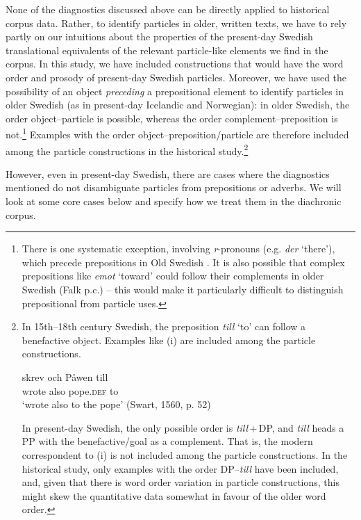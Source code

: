 \documentclass[output=paper]{langscibook}
\begin{document}
None of the diagnostics discussed above can be directly applied to historical corpus data. Rather, to identify particles in older, written texts, we have to rely partly on our intuitions about the properties of the present-day Swedish translational equivalents of the relevant particle-like elements we find in the corpus. In this study, we have included constructions that would have the word order and prosody of present-day Swedish particles. Moreover, we have used the possibility of an object \textit{preceding} a prepositional element to identify particles in older Swedish (as in present-day Icelandic and Norwegian): in older Swedish, the order object–particle is possible, whereas the order complement–preposition is not.\footnote{There is one systematic exception, involving \textit{r}{}-pronouns (e.g. \textit{der} ‘there’), which precede prepositions in Old Swedish \citep{Delsing2014Svenskans}. It is also possible that complex prepositions like \textit{emot} ‘toward’ could follow their complements in older Swedish (Falk p.c.) – this would make it particularly difficult to distinguish prepositional from particle uses.}  Examples with the order object–preposition/particle are therefore included among the particle constructions in the historical study.\footnote{In
    15th–18th century Swedish, the preposition \textit{till} ‘to’ can follow a benefactive object. Examples like (i) are included among the particle constructions.

    \ea
    \gll skrev   och   Påwen   till\\
    wrote   also  pope.\textsc{def}   to\\
    \glt ‘wrote also to the pope’ (Swart, 1560, p. 52)
    \z

    In present-day Swedish, the only possible order is \textit{till}\,+\,DP, and \textit{till} heads a PP with the benefactive/goal as a complement. That is, the modern correspondent to (i) is not included among the particle constructions. In the historical study, only examples with the order DP–\textit{till} have been included, and, given that there is word order variation in particle constructions, this might skew the quantitative data somewhat in favour of the older word order.
}



However, even in present-day Swedish, there are cases where the diagnostics mentioned do not disambiguate particles from prepositions or adverbs. We will look at some core cases below and specify how we treat them in the diachronic corpus.
\end{document}
